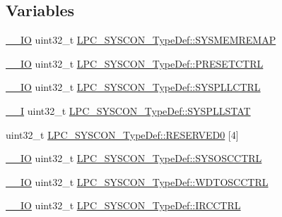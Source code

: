 \subsection*{Variables}
\begin{DoxyCompactItemize}
\item 
\hyperlink{group___c_m_s_i_s__core__definitions_gaec43007d9998a0a0e01faede4133d6be}{\+\_\+\+\_\+\+IO} uint32\+\_\+t \hyperlink{group___l_p_c11xx___definitions_ga970fb69752548b297feae4645834cce1}{L\+P\+C\+\_\+\+S\+Y\+S\+C\+O\+N\+\_\+\+Type\+Def\+::\+S\+Y\+S\+M\+E\+M\+R\+E\+M\+AP}
\item 
\hyperlink{group___c_m_s_i_s__core__definitions_gaec43007d9998a0a0e01faede4133d6be}{\+\_\+\+\_\+\+IO} uint32\+\_\+t \hyperlink{group___l_p_c11xx___definitions_gaf1a4b05ee430bb29acff26d16d65448d}{L\+P\+C\+\_\+\+S\+Y\+S\+C\+O\+N\+\_\+\+Type\+Def\+::\+P\+R\+E\+S\+E\+T\+C\+T\+RL}
\item 
\hyperlink{group___c_m_s_i_s__core__definitions_gaec43007d9998a0a0e01faede4133d6be}{\+\_\+\+\_\+\+IO} uint32\+\_\+t \hyperlink{group___l_p_c11xx___definitions_ga7c74ae51f98b5315c25dd045ce363f55}{L\+P\+C\+\_\+\+S\+Y\+S\+C\+O\+N\+\_\+\+Type\+Def\+::\+S\+Y\+S\+P\+L\+L\+C\+T\+RL}
\item 
\hyperlink{group___c_m_s_i_s__core__definitions_gaf63697ed9952cc71e1225efe205f6cd3}{\+\_\+\+\_\+I} uint32\+\_\+t \hyperlink{group___l_p_c11xx___definitions_gac3657072d53aa3907b0d49c252c7437f}{L\+P\+C\+\_\+\+S\+Y\+S\+C\+O\+N\+\_\+\+Type\+Def\+::\+S\+Y\+S\+P\+L\+L\+S\+T\+AT}
\item 
uint32\+\_\+t \hyperlink{group___l_p_c11xx___definitions_ga3b1f45f981b0b5c60a243403b3c158b9}{L\+P\+C\+\_\+\+S\+Y\+S\+C\+O\+N\+\_\+\+Type\+Def\+::\+R\+E\+S\+E\+R\+V\+E\+D0} \mbox{[}4\mbox{]}
\item 
\hyperlink{group___c_m_s_i_s__core__definitions_gaec43007d9998a0a0e01faede4133d6be}{\+\_\+\+\_\+\+IO} uint32\+\_\+t \hyperlink{group___l_p_c11xx___definitions_gafe759a051315e5daf1fe3d621bb72814}{L\+P\+C\+\_\+\+S\+Y\+S\+C\+O\+N\+\_\+\+Type\+Def\+::\+S\+Y\+S\+O\+S\+C\+C\+T\+RL}
\item 
\hyperlink{group___c_m_s_i_s__core__definitions_gaec43007d9998a0a0e01faede4133d6be}{\+\_\+\+\_\+\+IO} uint32\+\_\+t \hyperlink{group___l_p_c11xx___definitions_ga3ca10fa6e4f236c2f1a9dd0a801f81b3}{L\+P\+C\+\_\+\+S\+Y\+S\+C\+O\+N\+\_\+\+Type\+Def\+::\+W\+D\+T\+O\+S\+C\+C\+T\+RL}
\item 
\hyperlink{group___c_m_s_i_s__core__definitions_gaec43007d9998a0a0e01faede4133d6be}{\+\_\+\+\_\+\+IO} uint32\+\_\+t \hyperlink{group___l_p_c11xx___definitions_ga2b3e5d2e617c04cbf22c7af9070b86ee}{L\+P\+C\+\_\+\+S\+Y\+S\+C\+O\+N\+\_\+\+Type\+Def\+::\+I\+R\+C\+C\+T\+RL}

\end{DoxyCompactItemize}
